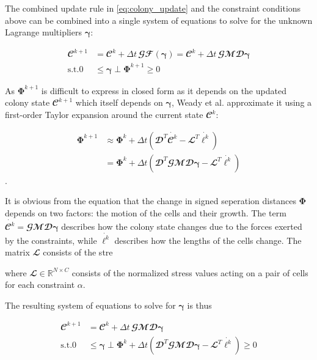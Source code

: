 \documentclass[conference]{IEEEtran}
\begin{document}
The combined update rule in \autoref{eq:colony_update} and the constraint conditions above can be combined into a single system of equations to solve for the unknown Lagrange multipliers $\boldsymbol{\gamma}$:

\begin{align}
    \mathbfcal{C}^{k+1} & = \mathbfcal{C}^k + \Delta t \, \mathbfcal{G}\mathbfcal{F}(\boldsymbol{\gamma}) = \mathbfcal{C}^k + \Delta t \, \mathbfcal{G}\mathbfcal{M} \mathbfcal{D} \boldsymbol{\gamma} \\
    \text{s.t.} 0       & \leq \boldsymbol{\gamma} \perp \mathbf{\Phi}^{k+1} \geq 0
\end{align}


As $\mathbf{\Phi}^{k+1}$ is difficult to express in closed form as it depends on the updated colony state $\mathbfcal{C}^{k+1}$ which itself depends on $\boldsymbol{\gamma}$, Weady et al. \cite{Weady2024} approximate it using a first-order Taylor expansion around the current state $\mathbfcal{C}^k$:

\begin{align}
    \mathbf{\Phi}^{k+1} & \approx \mathbf{\Phi}^k + \Delta t (\mathbfcal{D}^T \dot{\mathbfcal{C}^k} - \mathbfcal{L}^T \dot{\boldsymbol{\ell}^k})                                   \\
                        & = \mathbf{\Phi}^k + \Delta t (\mathbfcal{D}^T \mathbfcal{G} \mathbfcal{M} \mathbfcal{D} \boldsymbol{\gamma} - \mathbfcal{L}^T \dot{\boldsymbol{\ell}^k})
\end{align}.

It is obvious from the equation that the change in signed seperation distances $\mathbf{\Phi}$ depends on two factors: the motion of the cells and their growth. The term $\dot{\mathbfcal{C}^k} = \mathbfcal{G} \mathbfcal{M} \mathbfcal{D} \boldsymbol{\gamma}$ describes how the colony state changes due to the forces exerted by the constraints, while $\dot{\boldsymbol{\ell}^k}$ describes how the lengths of the cells change. The matrix $\mathbfcal{L}$ consists of the stre

where $\mathbfcal{L} \in \mathbb{R}^{N \times C}$ consists of the normalized stress values acting on a pair of cells for each constraint $\alpha$.

The resulting system of equations to solve for $\boldsymbol{\gamma}$ is thus

\begin{align}
    \mathbfcal{C}^{k+1} & = \mathbfcal{C}^k + \Delta t \, \mathbfcal{G}\mathbfcal{M} \mathbfcal{D} \boldsymbol{\gamma}                                                                                                 \\
    \text{s.t.} 0       & \leq \boldsymbol{\gamma} \perp \mathbf{\Phi}^k + \Delta t (\mathbfcal{D}^T \mathbfcal{G} \mathbfcal{M} \mathbfcal{D} \boldsymbol{\gamma} - \mathbfcal{L}^T \dot{\boldsymbol{\ell}^k}) \geq 0
\end{align}
\end{document}

